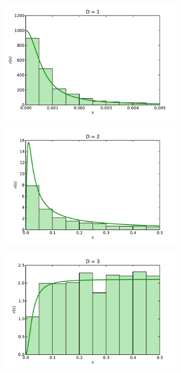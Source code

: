 \documentclass[a4paper,10pt]{article}
\begin{document}
\begin{figure}
 \centering
 	\begin{subfigure}[b]{.5\textwidth}
		\includegraphics[scale=.45]{images/length_distro1.pdf}
 	\end{subfigure}
 	 \begin{subfigure}[b]{.4\textwidth}
		\includegraphics[scale=.45]{images/length_distro2.pdf}
 	\end{subfigure}
 	 \begin{subfigure}[b]{.4\textwidth}
		\includegraphics[scale=.45]{images/length_distro3.pdf}

\end{subfigure}
\end{figure}
\end{document}
